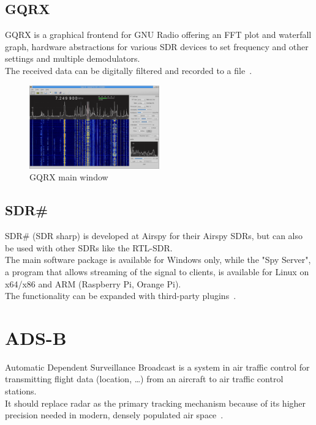 \documentclass[conference]{IEEEtran}
\begin{document}
\subsection{GQRX}
GQRX is a graphical frontend for GNU Radio offering an FFT plot and waterfall graph, hardware abstractions for various SDR devices to set frequency and other settings and multiple demodulators.\\
The received data can be digitally filtered and recorded to a file~\cite{GQRX19Home}.
\begin{figure}[H]
	\centering
	\includegraphics[width=0.5\textwidth]{gqrx_main_window}
	\caption{GQRX main window~\cite{GQRX19Home}}
\end{figure}

\subsection{SDR\#}
SDR\# (SDR sharp) is developed at Airspy for their Airspy SDRs, but can also be used with other SDRs like the RTL-SDR.\\The main software package is available for Windows only, while the "Spy Server", a program that allows streaming of the signal to clients, is available for Linux on x64/x86 and ARM (Raspberry Pi, Orange Pi).\\
The functionality can be expanded with third-party plugins~\cite{SDRsharp19Download}.

\section{ADS-B}
Automatic Dependent Surveillance Broadcast is a system in air traffic control for transmitting flight data (location, \ldots) from an aircraft to air traffic control stations.\\
It should replace radar as the primary tracking mechanism because of its higher precision needed in modern, densely populated air space~\cite{strohmeier2014realities}.
\end{document}
